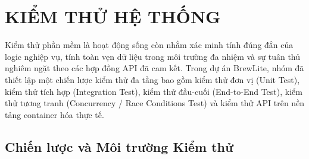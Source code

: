 \documentclass[12pt,a4paper,oneside]{report}
\begin{document}


\chapter{KIỂM THỬ HỆ THỐNG}
\label{ch:testing}

Kiểm thử phần mềm là hoạt động sống còn nhằm xác minh tính đúng đắn của logic nghiệp vụ, tính toàn vẹn dữ liệu trong môi trường đa nhiệm và sự tuân thủ nghiêm ngặt theo các hợp đồng API đã cam kết. Trong dự án BrewLite, nhóm đã thiết lập một chiến lược kiểm thử đa tầng bao gồm kiểm thử đơn vị (Unit Test), kiểm thử tích hợp (Integration Test), kiểm thử đầu-cuối (End-to-End Test), kiểm thử tương tranh (Concurrency / Race Conditions Test) và kiểm thử API trên nền tảng container hóa thực tế.

\section{Chiến lược và Môi trường Kiểm thử}
\end{document}
